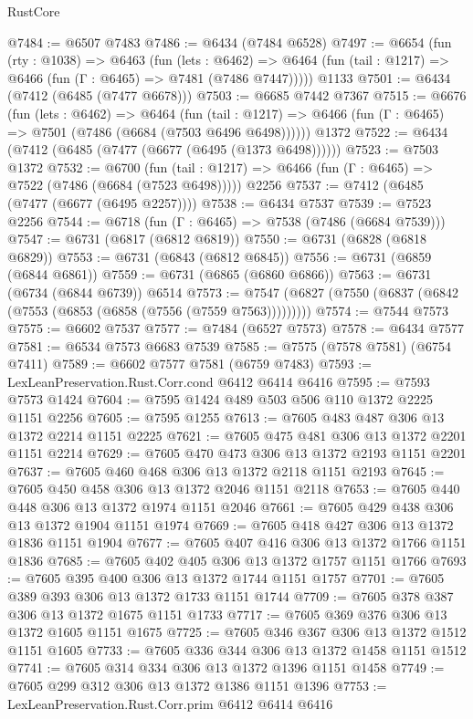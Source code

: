 \begin{lexlean}{RustCore}
\begin{coremodule}
@7484 := @6507 @7483
@7486 := @6434 (@7484 @6528)
@7497 := @6654
    (fun (rty : @1038) =>
    @6463
      (fun (lets : @6462) =>
      @6464 (fun (tail : @1217) => @6466 (fun (Γ : @6465) => @7481 (@7486 @7447)))))
    @1133
@7501 := @6434 (@7412 (@6485 (@7477 @6678)))
@7503 := @6685 @7442 @7367
@7515 := @6676
    (fun (lets : @6462) =>
    @6464
      (fun (tail : @1217) => @6466 (fun (Γ : @6465) => @7501 (@7486 (@6684 (@7503 @6496 @6498))))))
    @1372
@7522 := @6434 (@7412 (@6485 (@7477 (@6677 (@6495 (@1373 @6498))))))
@7523 := @7503 @1372
@7532 := @6700
    (fun (tail : @1217) => @6466 (fun (Γ : @6465) => @7522 (@7486 (@6684 (@7523 @6498)))))
    @2256
@7537 := @7412 (@6485 (@7477 (@6677 (@6495 @2257))))
@7538 := @6434 @7537
@7539 := @7523 @2256
@7544 := @6718 (fun (Γ : @6465) => @7538 (@7486 (@6684 @7539)))
@7547 := @6731 (@6817 (@6812 @6819))
@7550 := @6731 (@6828 (@6818 @6829))
@7553 := @6731 (@6843 (@6812 @6845))
@7556 := @6731 (@6859 (@6844 @6861))
@7559 := @6731 (@6865 (@6860 @6866))
@7563 := @6731 (@6734 (@6844 @6739)) @6514
@7573 := @7547 (@6827 (@7550 (@6837 (@6842 (@7553 (@6853 (@6858 (@7556 (@7559 @7563)))))))))
@7574 := @7544 @7573
@7575 := @6602 @7537
@7577 := @7484 (@6527 @7573)
@7578 := @6434 @7577
@7581 := @6534 @7573 @6683 @7539
@7585 := @7575 (@7578 @7581) (@6754 @7411)
@7589 := @6602 @7577 @7581 (@6759 @7483)
@7593 := LexLeanPreservation.Rust.Corr.cond @6412 @6414 @6416
@7595 := @7593 @7573 @1424
@7604 := @7595 @1424 @489 @503 @506 @110 @1372 @2225 @1151 @2256
@7605 := @7595 @1255
@7613 := @7605 @483 @487 @306 @13 @1372 @2214 @1151 @2225
@7621 := @7605 @475 @481 @306 @13 @1372 @2201 @1151 @2214
@7629 := @7605 @470 @473 @306 @13 @1372 @2193 @1151 @2201
@7637 := @7605 @460 @468 @306 @13 @1372 @2118 @1151 @2193
@7645 := @7605 @450 @458 @306 @13 @1372 @2046 @1151 @2118
@7653 := @7605 @440 @448 @306 @13 @1372 @1974 @1151 @2046
@7661 := @7605 @429 @438 @306 @13 @1372 @1904 @1151 @1974
@7669 := @7605 @418 @427 @306 @13 @1372 @1836 @1151 @1904
@7677 := @7605 @407 @416 @306 @13 @1372 @1766 @1151 @1836
@7685 := @7605 @402 @405 @306 @13 @1372 @1757 @1151 @1766
@7693 := @7605 @395 @400 @306 @13 @1372 @1744 @1151 @1757
@7701 := @7605 @389 @393 @306 @13 @1372 @1733 @1151 @1744
@7709 := @7605 @378 @387 @306 @13 @1372 @1675 @1151 @1733
@7717 := @7605 @369 @376 @306 @13 @1372 @1605 @1151 @1675
@7725 := @7605 @346 @367 @306 @13 @1372 @1512 @1151 @1605
@7733 := @7605 @336 @344 @306 @13 @1372 @1458 @1151 @1512
@7741 := @7605 @314 @334 @306 @13 @1372 @1396 @1151 @1458
@7749 := @7605 @299 @312 @306 @13 @1372 @1386 @1151 @1396
@7753 := LexLeanPreservation.Rust.Corr.prim @6412 @6414 @6416

\end{coremodule}
\end{lexlean}

